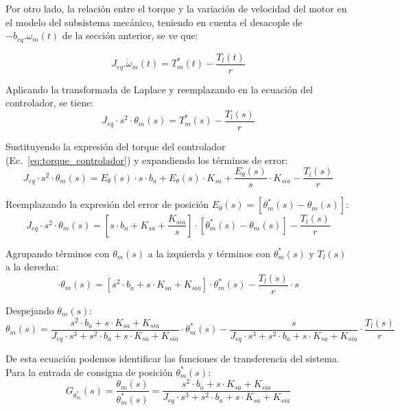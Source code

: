 \documentclass{article}
\begin{document}
Por otro lado, la relación entre el torque y la variación de velocidad del motor en el modelo del subsistema mecánico, 
teniendo en cuenta el desacople de $-b_{eq}.\omega_m(t)$ de la sección anterior, se ve que:

\begin{equation}
J_{eq}.\dot{\omega}_m(t) = T_m^*(t) - \frac{T_l(t)}{r}
\end{equation}

Aplicando la transformada de Laplace y reemplazando en la ecuación del controlador, se tiene:
\begin{equation}
J_{eq} \cdot s^2 \cdot \theta_m(s) = T_m^*(s) - \frac{T_l(s)}{r}
\label{eq:laplace_mecanica}
\end{equation}

Sustituyendo la expresión del torque del controlador (Ec.~\ref{eq:torque_controlador}) y expandiendo los términos de error:
\begin{equation}
J_{eq} \cdot s^2 \cdot \theta_m(s) = E_\theta(s) \cdot s \cdot b_a + E_\theta(s) \cdot K_{sa} + \frac{E_\theta(s)}{s} \cdot K_{sia} - \frac{T_l(s)}{r}
\label{eq:sustitucion_torque}
\end{equation}

Reemplazando la expresión del error de posición $E_\theta(s) = [\theta_m^*(s) - \theta_m(s)]$:
\begin{equation}
J_{eq} \cdot s^2 \cdot \theta_m(s) = \left[s \cdot b_a + K_{sa} + \frac{K_{sia}}{s}\right] \cdot [\theta_m^*(s) - \theta_m(s)] - \frac{T_l(s)}{r}
\label{eq:reemplazo_error}
\end{equation}

Agrupando términos con $\theta_m(s)$ a la izquierda y términos con $\theta_m^*(s)$ y $T_l(s)$ a la derecha:
\begin{equation}
[J_{eq} \cdot s^3 + s^2 \cdot b_a + s \cdot K_{sa} + K_{sia}] \cdot \theta_m(s) = [s^2 \cdot b_a + s \cdot K_{sa} + K_{sia}] \cdot \theta_m^*(s) - \frac{T_l(s)}{r} \cdot s
\label{eq:agrupacion_terminos}
\end{equation}

Despejando $\theta_m(s)$:
\begin{equation}
\theta_m(s) = \frac{s^2 \cdot b_a + s \cdot K_{sa} + K_{sia}}{J_{eq} \cdot s^3 + s^2 \cdot b_a + s \cdot K_{sa} + K_{sia}} \cdot \theta_m^*(s) - \frac{s}{J_{eq} \cdot s^3 + s^2 \cdot b_a + s \cdot K_{sa} + K_{sia}} \cdot \frac{T_l(s)}{r}
\label{eq:theta_despejada}
\end{equation}

De esta ecuación podemos identificar las funciones de transferencia del sistema. Para la entrada de consigna de posición $\theta_m^*(s)$:
\begin{equation}
G_{\theta^*_m}(s) = \frac{\theta_m(s)}{\theta_m^*(s)} = \frac{s^2 \cdot b_a + s \cdot K_{sa} + K_{sia}}{J_{eq} \cdot s^3 + s^2 \cdot b_a + s \cdot K_{sa} + K_{sia}}
\label{eq:FT_consigna}
\end{equation}
\end{document}
